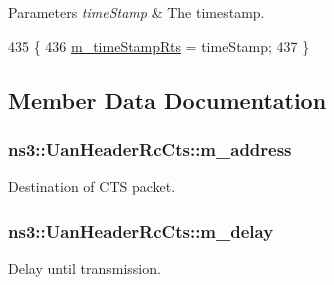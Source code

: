 \begin{DoxyParams}{Parameters}
{\em time\+Stamp} & The timestamp. \\
\hline
\end{DoxyParams}

\begin{DoxyCode}
435 \{
436   \hyperlink{classns3_1_1UanHeaderRcCts_a8eaa740a99d0177683659baadcc54627}{m\_timeStampRts} = timeStamp;
437 \}
\end{DoxyCode}


\subsection{Member Data Documentation}
\subsubsection[{\texorpdfstring{m\+\_\+address}{m_address}}]{ ns3\+::\+Uan\+Header\+Rc\+Cts\+::m\+\_\+address\hspace{0.3cm}{\ttfamily [private]}}\hypertarget{classns3_1_1UanHeaderRcCts_ab7432b54cf329c3c75a22381d8f831c0}{}\label{classns3_1_1UanHeaderRcCts_ab7432b54cf329c3c75a22381d8f831c0}


Destination of C\+TS packet. 

\subsubsection[{\texorpdfstring{m\+\_\+delay}{m_delay}}]{ ns3\+::\+Uan\+Header\+Rc\+Cts\+::m\+\_\+delay\hspace{0.3cm}{\ttfamily [private]}}\hypertarget{classns3_1_1UanHeaderRcCts_a82ac3cbfba4945bacbbf010e9f25b53b}{}\label{classns3_1_1UanHeaderRcCts_a82ac3cbfba4945bacbbf010e9f25b53b}


Delay until transmission. 

